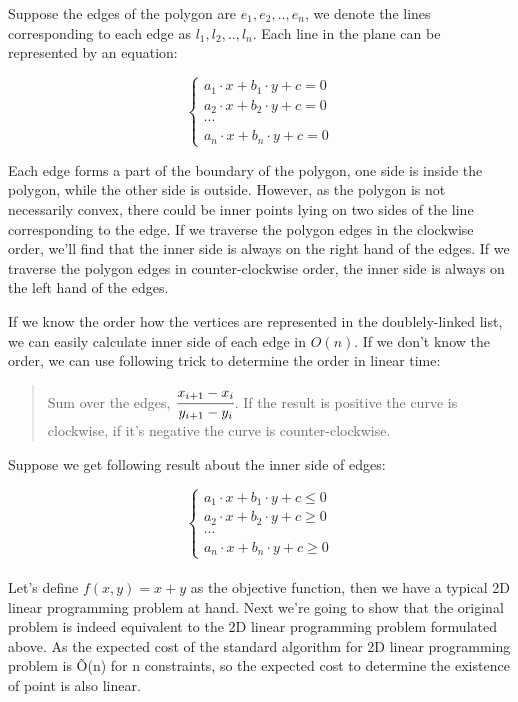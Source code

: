 
Suppose the edges of the polygon are $e_1, e_2, .., e_n$, we denote the lines corresponding to each edge as $l_1, l_2, .., l_n$. Each line in the plane can be represented by an equation:

\[
  \left\{
      \begin{array}{c}
          a_1 \cdot x + b_1 \cdot y + c = 0 \\
          a_2 \cdot x + b_2 \cdot y + c = 0 \\
          \cdots \\
          a_n \cdot x + b_n \cdot y + c = 0
      \end{array}
  \right.
\]

Each edge forms a part of the boundary of the polygon, one side is inside the polygon, while the other side is outside. However, as the polygon is not necessarily convex, there could be inner points lying on two sides of the line corresponding to the edge. If we traverse the polygon edges in the clockwise order, we'll find that the inner side is always on the right hand of the edges. If we traverse the polygon edges in counter-clockwise order, the inner side is always on the left hand of the edges.

If we know the order how the vertices are represented in the doublely-linked list, we can easily calculate inner side of each edge in $O(n)$. If we don't know the order, we can use following trick to determine the order in linear time:

\begin{quote}
Sum over the edges, $\cfrac{x_{i+1}-x_i}{y_{i+1}-y_i}$. If the result is positive the curve is clockwise, if it's negative the curve is counter-clockwise.
\end{quote}

Suppose we get following result about the inner side of edges:

\[
  \left\{
      \begin{array}{c}
          a_1 \cdot x + b_1 \cdot y + c \leq 0 \\
          a_2 \cdot x + b_2 \cdot y + c \geq 0 \\
          \cdots \\
          a_n \cdot x + b_n \cdot y + c \geq 0
      \end{array}
  \right.
\]\\

Let's define $f(x, y) = x + y$ as the objective function, then we have a typical 2D linear programming problem at hand. Next we're going to show that the original problem is indeed equivalent to the 2D linear programming problem formulated above. As the expected cost of the standard algorithm for 2D linear programming problem is \~O(n) for n constraints, so the expected cost to determine the existence of point is also linear.\\


